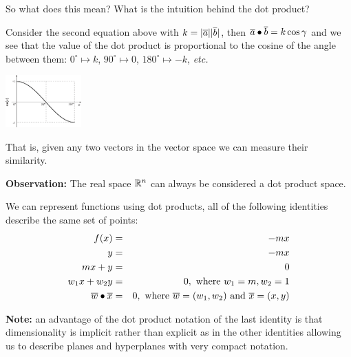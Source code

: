 \documentclass[a4paper,blends,pdf,colorBG,slideColor]{prosper}
\begin{document}
So what does this mean?  What is the intuition behind the dot product?

\begin{center}
\end{center}

Consider the second equation above with $k = |{\overline{a}}| |{\overline{b}}|$, then $\overline{a}\bullet\overline{b} = k \cos\gamma$ and
we see that the value of the dot product is proportional to the cosine of the angle between them: $0^\circ\mapsto k$, $90^\circ\mapsto 0$, $180^\circ\mapsto -k$, {\em etc.}
\begin{center}
\includegraphics[height=20mm]{figures/fig03-06.eps}
\end{center}
\es

\vspace{.2in}

\vspace{.2in}
That is, given any two vectors in the vector space we can measure their similarity.

\vspace{.2in}

\vspace{.2in}
{\bf Observation:} The real space $\mathbb{R}^{n}$ can always be considered a dot product space.


\es

We can represent functions using dot products, all of the following identities
describe the same set of points:
\begin{eqnarray*}
f(x) &=& -mx\\
y &=& -mx\\
mx + y &=& 0\\
w_1 x + w_2 y &=& 0, \mbox{ where } w_1 = m, w_2 = 1\\
\overline{w}\bullet\overline{x} &=& 0, \mbox{ where $\overline{w} = (w_1, w_2)$ and $\overline{x} = (x,y)$}
\end{eqnarray*}

{\bf Note:} an advantage of the dot product notation of the last identity
 is that dimensionality is implicit 
rather than explicit as in the other identities allowing us to describe planes and
hyperplanes with very compact notation.
\end{document}
